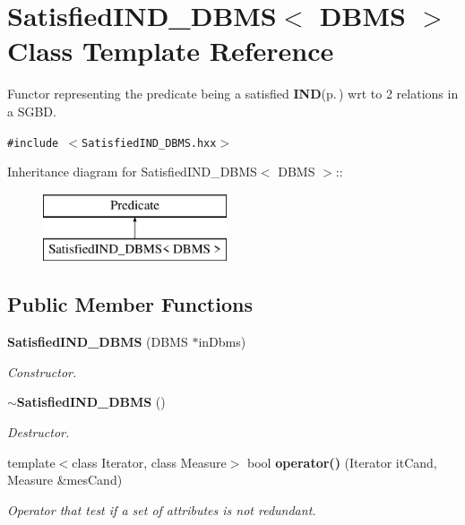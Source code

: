 \section{Satisfied\-IND\_\-DBMS$<$ DBMS $>$ Class Template Reference}
\label{class_satisfied_i_n_d___d_b_m_s}
Functor representing the predicate being a satisfied {\bf IND}{\rm (p.\,\pageref{class_i_n_d})} wrt to 2 relations in a SGBD.  


{\tt \#include $<$Satisfied\-IND\_\-DBMS.hxx$>$}

Inheritance diagram for Satisfied\-IND\_\-DBMS$<$ DBMS $>$::\begin{figure}[H]
\begin{center}
\leavevmode
\includegraphics[height=2cm]{class_satisfied_i_n_d___d_b_m_s}
\end{center}
\end{figure}
\subsection*{Public Member Functions}
\begin{CompactItemize}
\item 
{\bf Satisfied\-IND\_\-DBMS} (DBMS $\ast$in\-Dbms)
\begin{CompactList}\small\item\em Constructor. \item\end{CompactList}\item 
{\bf $\sim$Satisfied\-IND\_\-DBMS} ()\label{class_satisfied_i_n_d___d_b_m_s_26071485b5e3be1fb328fe4cc1a9a336}

\begin{CompactList}\small\item\em Destructor. \item\end{CompactList}\item 
template$<$class Iterator, class Measure$>$ bool {\bf operator()} (Iterator it\-Cand, Measure \&mes\-Cand)\label{class_satisfied_i_n_d___d_b_m_s_10cb098e49804f3de10b20c1d3317814}

\begin{CompactList}\small\item\em Operator that test if a set of attributes is not redundant. \item\end{CompactList}\end{CompactItemize}
